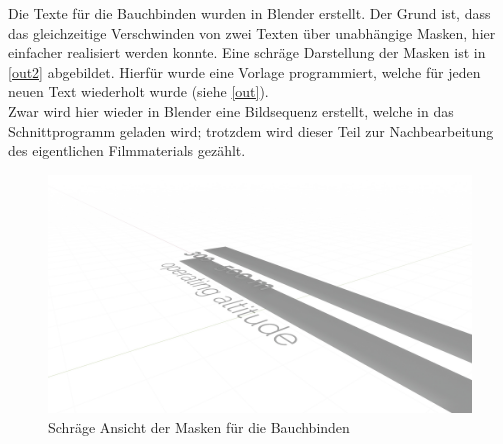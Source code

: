 Die Texte für die Bauchbinden wurden in Blender erstellt. Der Grund ist, dass das gleichzeitige Verschwinden von zwei Texten über unabhängige Masken, hier einfacher realisiert werden konnte. Eine schräge Darstellung der Masken ist in \autoref{out2} abgebildet. Hierfür wurde eine Vorlage programmiert, welche für jeden neuen Text wiederholt wurde (siehe \autoref{out}).\\
Zwar wird hier wieder in Blender eine Bildsequenz erstellt, welche in das Schnittprogramm geladen wird; trotzdem wird dieser Teil zur Nachbearbeitung des eigentlichen Filmmaterials gezählt.

\begin{figure}[H]
\begin{center}
\includegraphics[width=\textwidth]{gfx/post/call-out2.jpg}
\caption{Schräge Ansicht der Masken für die Bauchbinden}
\label{out2}
\end{center}
\end{figure}

